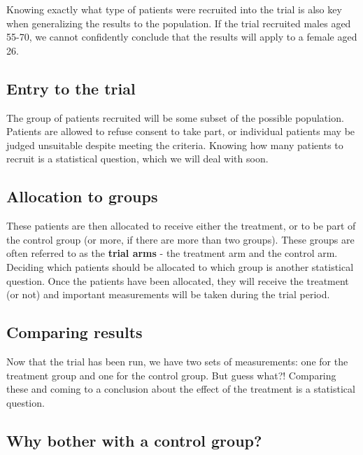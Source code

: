 \documentclass[
  openany]{book}
\theoremstyle{definition}
\theoremstyle{definition}
\theoremstyle{definition}
\theoremstyle{definition}
\theoremstyle{remark}
\begin{document}
Knowing exactly what type of patients were recruited into the trial is also key when generalizing the results to the population. If the trial recruited males aged 55-70, we cannot confidently conclude that the results will apply to a female aged 26.

\subsection*{Entry to the trial}\label{entry-to-the-trial}

The group of patients recruited will be some subset of the possible population. Patients are allowed to refuse consent to take part, or individual patients may be judged unsuitable despite meeting the criteria. Knowing how many patients to recruit is a statistical question, which we will deal with soon.

\subsection*{Allocation to groups}\label{allocation-to-groups}

These patients are then allocated to receive either the treatment, or to be part of the control group (or more, if there are more than two groups). These groups are often referred to as the \textbf{trial arms} - the treatment arm and the control arm. Deciding which patients should be allocated to which group is another statistical question. Once the patients have been allocated, they will receive the treatment (or not) and important measurements will be taken during the trial period.

\subsection*{Comparing results}\label{comparing-results}

Now that the trial has been run, we have two sets of measurements: one for the treatment group and one for the control group. But guess what?! Comparing these and coming to a conclusion about the effect of the treatment is a statistical question.

\subsection*{Why bother with a control group?}\label{why-bother-with-a-control-group}
\end{document}
